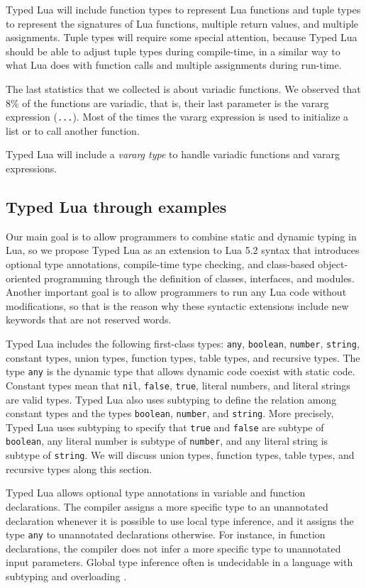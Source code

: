 \documentclass[preprint]{sig-alternate}
\begin{document}
Typed Lua will include function types to represent Lua functions
and tuple types to represent the signatures of Lua functions,
multiple return values, and multiple assignments.
Tuple types will require some special attention, because Typed Lua
should be able to adjust tuple types during compile-time, in a
similar way to what Lua does with function calls and multiple
assignments during run-time.

The last statistics that we collected is about variadic functions.
We observed that 8\% of the functions are variadic, that is,
their last parameter is the vararg expression (\verb'...').
Most of the times the vararg expression is used to initialize a
list or to call another function.

Typed Lua will include a \textit{vararg type} to handle variadic
functions and vararg expressions.

\subsection{Typed Lua through examples}

Our main goal is to allow programmers to combine static and dynamic
typing in Lua, so we propose Typed Lua as an extension to Lua 5.2
syntax that introduces optional type annotations, compile-time type
checking, and class-based object-oriented programming through the
definition of classes, interfaces, and modules.
Another important goal is to allow programmers to run any Lua code
without modifications, so that is the reason why these syntactic
extensions include new keywords that are not reserved words.

Typed Lua includes the following first-class types: \verb'any',
\verb'boolean', \verb'number', \verb'string', constant types,
union types, function types, table types, and recursive types.
The type \verb'any' is the dynamic type that allows dynamic code
coexist with static code.
Constant types mean that \verb'nil', \verb'false', \verb'true',
literal numbers, and literal strings are valid types.
Typed Lua also uses subtyping to define the relation among constant
types and the types \verb'boolean', \verb'number', and \verb'string'.
More precisely, Typed Lua uses subtyping to specify that
\verb'true' and \verb'false' are subtype of \verb'boolean',
any literal number is subtype of \verb'number', and any literal
string is subtype of \verb'string'.
We will discuss union types, function types, table types, and
recursive types along this section.

Typed Lua allows optional type annotations in variable and function
declarations.
The compiler assigns a more specific type to an unannotated
declaration whenever it is possible to use local type inference,
and it assigns the type \verb'any' to unannotated declarations
otherwise.
For instance, in function declarations, the compiler does not infer
a more specific type to unannotated input parameters.
Global type inference often is undecidable in a language with
subtyping and overloading \cite{wells1999typability}.
\end{document}
